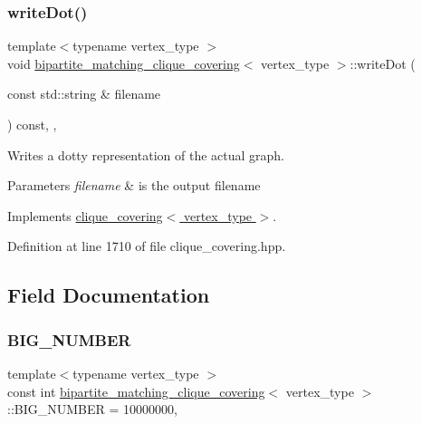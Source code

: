 \subsubsection{\texorpdfstring{write\+Dot()}{writeDot()}}
{\footnotesize\ttfamily template$<$typename vertex\+\_\+type $>$ \\
void \hyperlink{classbipartite__matching__clique__covering}{bipartite\+\_\+matching\+\_\+clique\+\_\+covering}$<$ vertex\+\_\+type $>$\+::write\+Dot (\begin{DoxyParamCaption}\item[{const std\+::string \&}]{filename }\end{DoxyParamCaption}) const\hspace{0.3cm}{\ttfamily [inline]}, {\ttfamily [override]}, {\ttfamily [virtual]}}



Writes a dotty representation of the actual graph. 


\begin{DoxyParams}{Parameters}
{\em filename} & is the output filename \\
\hline
\end{DoxyParams}


Implements \hyperlink{classclique__covering_a67c99c3f13f8a9400ae6e83d8bd31ba5}{clique\+\_\+covering$<$ vertex\+\_\+type $>$}.



Definition at line 1710 of file clique\+\_\+covering.\+hpp.



\subsection{Field Documentation}
\mbox{\label{classbipartite__matching__clique__covering_aa0dfe6145678c058eb4cfadb051f6a0b}} 
\subsubsection{\texorpdfstring{B\+I\+G\+\_\+\+N\+U\+M\+B\+ER}{BIG\_NUMBER}}
{\footnotesize\ttfamily template$<$typename vertex\+\_\+type $>$ \\
const int \hyperlink{classbipartite__matching__clique__covering}{bipartite\+\_\+matching\+\_\+clique\+\_\+covering}$<$ vertex\+\_\+type $>$\+::B\+I\+G\+\_\+\+N\+U\+M\+B\+ER = 10000000\hspace{0.3cm}{\ttfamily [static]}, {\ttfamily [private]}}



